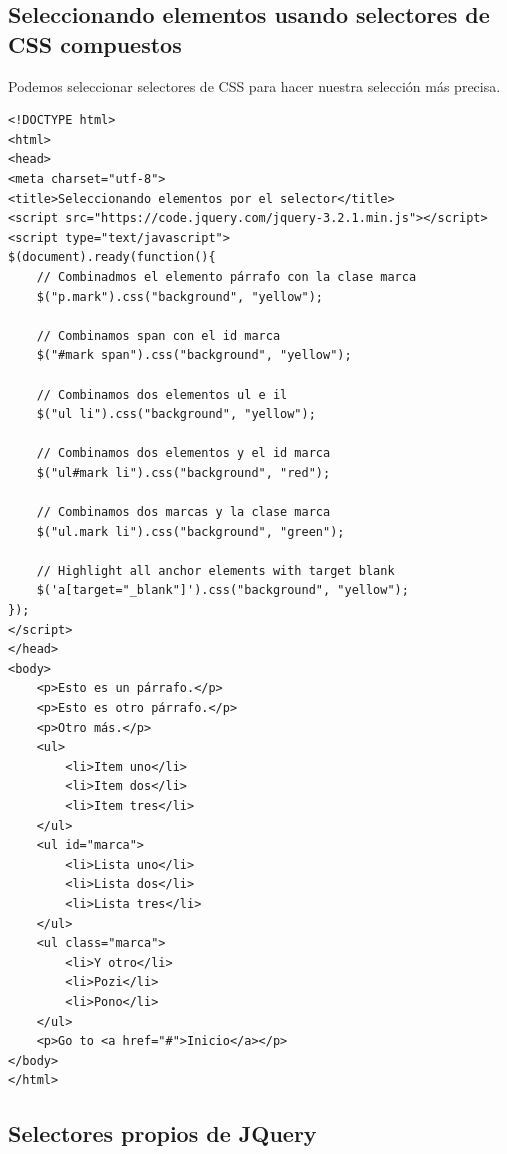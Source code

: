 \documentclass[11pt]{article}
\begin{document}
\subsection*{Seleccionando elementos usando selectores de CSS compuestos}
\label{sec:orgde16cbe}

Podemos seleccionar selectores de CSS para hacer nuestra selección más precisa.

\begin{verbatim}
<!DOCTYPE html>
<html>
<head>
<meta charset="utf-8">
<title>Seleccionando elementos por el selector</title>
<script src="https://code.jquery.com/jquery-3.2.1.min.js"></script>
<script type="text/javascript">
$(document).ready(function(){
    // Combinadmos el elemento párrafo con la clase marca
    $("p.mark").css("background", "yellow");

    // Combinamos span con el id marca
    $("#mark span").css("background", "yellow");

    // Combinamos dos elementos ul e il
    $("ul li").css("background", "yellow");

    // Combinamos dos elementos y el id marca
    $("ul#mark li").css("background", "red");

    // Combinamos dos marcas y la clase marca
    $("ul.mark li").css("background", "green");

    // Highlight all anchor elements with target blank
    $('a[target="_blank"]').css("background", "yellow");
});
</script>
</head>
<body>
    <p>Esto es un párrafo.</p>
    <p>Esto es otro párrafo.</p>
    <p>Otro más.</p>
    <ul>
        <li>Item uno</li>
        <li>Item dos</li>
        <li>Item tres</li>
    </ul>
    <ul id="marca">
        <li>Lista uno</li>
        <li>Lista dos</li>
        <li>Lista tres</li>
    </ul>
    <ul class="marca">
        <li>Y otro</li>
        <li>Pozi</li>
        <li>Pono</li>
    </ul>
    <p>Go to <a href="#">Inicio</a></p>
</body>
</html>                                		
\end{verbatim}

\subsection*{Selectores propios de JQuery}
\label{sec:org8704df3}
\end{document}
